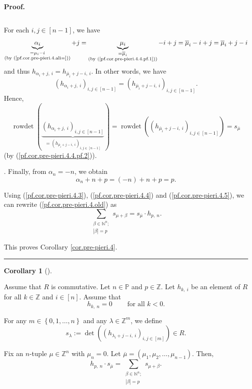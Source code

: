 \documentclass
[numbers=enddot,12pt,final,onecolumn,notitlepage,english]{scrartcl}%
\theoremstyle{definition}
\newtheorem{coro}[theo]{Corollary}
\newenvironment{corollary}[1][]
{\begin{coro}[#1]\begin{leftbar}}
{\end{leftbar}\end{coro}}
\newenvironment{proof}[1][Proof]{\noindent\textbf{#1.} }{\ \rule{0.5em}{0.5em}}
\let\sumnonlimits\sum
\renewcommand{\sum}{\sumnonlimits\limits}
\newenvironment{verlong}{}{}
\begin{document}
\begin{proof}
\begin{verlong}
{\begin{equation}
\label{pf.cor.pre-pieri.4.4.pf.2}%
\end{equation}
\par
For each $i,j\in\left[  n-1\right]  $, we have
\[
\underbrace{\alpha_{i}}_{\substack{=\mu_{i}-i\\\text{(by
(\ref{pf.cor.pre-pieri.4.ali=}))}}}+j=\underbrace{\mu_{i}}%
_{\substack{=\overline{\mu}_{i}\\\text{(by (\ref{pf.cor.pre-pieri.4.4.pf.1}%
))}}}-i+j=\overline{\mu}_{i}-i+j=\overline{\mu}_{i}+j-i
\]
and thus $h_{\alpha_{i}+j,\ i}=h_{\overline{\mu}_{i}+j-i,\ i}$. In other
words, we have
\[
\left(  h_{\alpha_{i}+j,\ i}\right)  _{i,j\in\left[  n-1\right]  }=\left(
h_{\overline{\mu}_{i}+j-i,\ i}\right)  _{i,j\in\left[  n-1\right]  }.
\]
Hence,%
\[
\operatorname*{rowdet}\left(  \underbrace{\left(  h_{\alpha_{i}+j,\ i}\right)
_{i,j\in\left[  n-1\right]  }}_{=\left(  h_{\overline{\mu}_{i}+j-i,\ i}%
\right)  _{i,j\in\left[  n-1\right]  }}\right)  =\operatorname*{rowdet}\left(
\left(  h_{\overline{\mu}_{i}+j-i,\ i}\right)  _{i,j\in\left[  n-1\right]
}\right)  =s_{\overline{\mu}}%
\]
(by (\ref{pf.cor.pre-pieri.4.4.pf.2})).}. Finally, from $\alpha_{n}=-n$, we
obtain
\begin{equation}
\alpha_{n}+n+p=\left(  -n\right)  +n+p=p. \label{pf.cor.pre-pieri.4.5}%
\end{equation}


Using (\ref{pf.cor.pre-pieri.4.3}), (\ref{pf.cor.pre-pieri.4.4}) and
(\ref{pf.cor.pre-pieri.4.5}), we can rewrite (\ref{pf.cor.pre-pieri.4.old}) as%
\[
\sum_{\substack{\beta\in\mathbb{N}^{n};\\\left\vert \beta\right\vert
=p}}s_{\mu+\beta}=s_{\overline{\mu}}\cdot h_{p,\ n}.
\]

\end{verlong}

\noindent This proves Corollary \ref{cor.pre-pieri.4}.
\end{proof}

\begin{corollary}
\label{cor.pre-pieri.4comm}Assume that $R$ is commutative. Let $n\in
\mathbb{P}$ and $p\in\mathbb{Z}$. Let $h_{k,\ i}$ be an element of $R$ for all
$k\in\mathbb{Z}$ and $i\in\left[  n\right]  $. Assume that%
\[
h_{k,\ n}=0\ \ \ \ \ \ \ \ \ \ \text{for all }k<0.
\]


For any $m\in\left\{  0,1,\ldots,n\right\}  $ and any $\lambda\in
\mathbb{Z}^{m}$, we define%
\[
s_{\lambda}:=\det\left(  \left(  h_{\lambda_{i}+j-i,\ i}\right)
_{i,j\in\left[  m\right]  }\right)  \in R.
\]


Fix an $n$-tuple $\mu\in\mathbb{Z}^{n}$ with $\mu_{n}=0$. Let $\overline{\mu
}=\left(  \mu_{1},\mu_{2},\ldots,\mu_{n-1}\right)  $. Then,%
\begin{equation}
h_{p,\ n}\cdot s_{\overline{\mu}}=\sum_{\substack{\beta\in\mathbb{N}%
^{n};\\\left\vert \beta\right\vert =p}}s_{\mu+\beta}.
\label{eq.cor.pre-pieri.4comm.eq}%
\end{equation}

\end{corollary}
\end{document}

